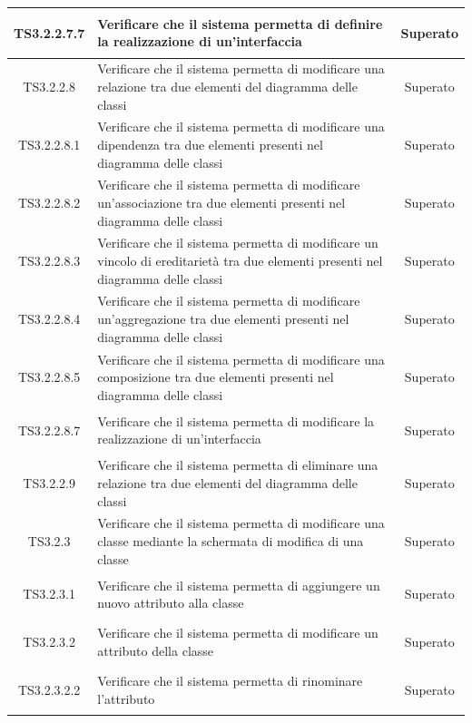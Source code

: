 \documentclass[../PianoDiQualifica.tex]{subfiles}
\begin{document}
\begin{longtable}{|c|>{\centering}p{10cm}|c|}
	\hline
	\hypertarget{TS3.2.2.7.7}{TS3.2.2.7.7} & Verificare che il sistema permetta di definire la realizzazione di un'interfaccia & Superato \\
	\hline
	\hypertarget{TS3.2.2.8}{TS3.2.2.8} & Verificare che il sistema permetta di modificare una relazione tra due elementi del diagramma delle classi & Superato \\
	\hline
	\hypertarget{TS3.2.2.8.1}{TS3.2.2.8.1} & Verificare che il sistema permetta di modificare una dipendenza tra due elementi presenti nel diagramma delle classi & Superato \\
	\hline
	\hypertarget{TS3.2.2.8.2}{TS3.2.2.8.2} & Verificare che il sistema permetta di modificare un'associazione tra due elementi presenti nel diagramma delle classi & Superato \\
	\hline
	\hypertarget{TS3.2.2.8.3}{TS3.2.2.8.3} & Verificare che il sistema permetta di modificare un vincolo di ereditarietà tra due elementi presenti nel diagramma delle classi & Superato \\
	\hline
	\hypertarget{TS3.2.2.8.4}{TS3.2.2.8.4} & Verificare che il sistema permetta di modificare un'aggregazione tra due elementi presenti nel diagramma delle classi & Superato \\
	\hline
	\hypertarget{TS3.2.2.8.5}{TS3.2.2.8.5} & Verificare che il sistema permetta di modificare una composizione tra due elementi presenti nel diagramma delle classi & Superato \\
	\hline
	\hypertarget{TS3.2.2.8.7}{TS3.2.2.8.7} & Verificare che il sistema permetta di modificare la realizzazione di un'interfaccia & Superato \\
	\hline
	\hypertarget{TS3.2.2.9}{TS3.2.2.9} & Verificare che il sistema permetta di eliminare una relazione tra due elementi del diagramma delle classi & Superato \\
	\hline
	\hypertarget{TS3.2.3}{TS3.2.3} & Verificare che il sistema permetta di modificare una classe mediante la schermata di modifica di una classe & Superato\\
	\hline
	\hypertarget{TS3.2.3.1}{TS3.2.3.1} & Verificare che il sistema permetta di aggiungere un nuovo attributo alla classe & Superato \\
	\hline
	\hypertarget{TS3.2.3.2}{TS3.2.3.2} & Verificare che il sistema permetta di modificare un attributo della classe & Superato \\
	\hline
	\hypertarget{TS3.2.3.2.2}{TS3.2.3.2.2} & Verificare che il sistema permetta di rinominare l'attributo & Superato \\

\end{longtable}
\end{document}
